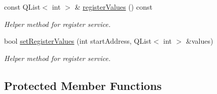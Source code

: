 \begin{DoxyCompactItemize}
const Q\-List$<$ int $>$ \& \hyperlink{classmdt_device_modbus_a83cb2a28111653fbcbbe748f7a1a2e3d}{register\-Values} () const 
\begin{DoxyCompactList}\small\item\em Helper method for register service. \end{DoxyCompactList}\item 
bool \hyperlink{classmdt_device_modbus_a4128420bde679c3666bdf8954a221a53}{set\-Register\-Values} (int start\-Address, Q\-List$<$ int $>$ \&values)
\begin{DoxyCompactList}\small\item\em Helper method for register service. \end{DoxyCompactList}\end{DoxyCompactItemize}
\subsection*{Protected Member Functions}
